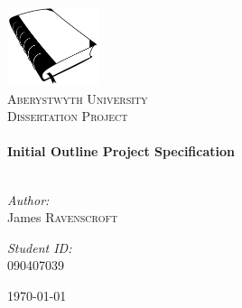 \begin{titlepage}
 
\begin{center}
 
 
\includegraphics[width=0.20\textwidth]{../cover_logo.png}\\[1cm]
 
\textsc{\LARGE Aberystwyth University}\\[1.5cm]
 
\textsc{\LARGE Dissertation Project}\\[0.5cm]
 
 
\HRule \\[0.4cm]
{ \huge \bfseries Initial Outline Project Specification}\\[0.4cm]
 
\HRule \\[1.5cm]

\begin{minipage}{0.4\textwidth}
\begin{flushleft} \large
\emph{Author:}\\
James \textsc{Ravenscroft}
\end{flushleft}
\end{minipage}
\begin{minipage}{0.4\textwidth}
\begin{flushright} \large
\emph{Student ID:} \\
090407039
\end{flushright}
\end{minipage}

\vfill
 
{\large \today}
 
\end{center}
 
\end{titlepage}

